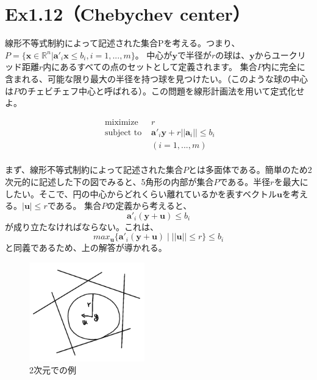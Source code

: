 \documentclass{jsarticle}
\begin{document}
\newpage

\section*{Ex1.12（Chebychev center）}

線形不等式制約によって記述された集合Pを考える。つまり、$P=\{\bm{x}\in \mathbb{R}^n|\bm{a}'_i\bm{x}\leq b_i,i = 1,...,m\}$。 中心が$\bm{y}$で半径が$r$の球は、$\bm{y}$からユークリッド距離$r$内にあるすべての点のセットとして定義されます。 集合$P$内に完全に含まれる、可能な限り最大の半径を持つ球を見つけたい。（このような球の中心は$P$のチェビチェフ中心と呼ばれる）。この問題を線形計画法を用いて定式化せよ。

\begin{equation}
\begin{array}{cc}
\text { miximize } & r \\
\text { subject to } & \bm{a}'_i\bm{y}+r||\bm{a}_i||\leq b_i\\
&(i=1,...,m)
\end{array}
\end{equation}
\\
まず、線形不等式制約によって記述された集合$P$とは多面体である。簡単のため2次元的に記述した下の図でみると、5角形の内部が集合$P$である。半径$r$を最大にしたい。そこで、円の中心からどれくらい離れているかを表すベクトル$\bm{u}$を考える。$|\bm{u}|\leq r$である。
集合$P$の定義から考えると、
\begin{equation}
\bm{a}'_i(\bm{y}+\bm{u})\leq b_i
\end{equation}
が成り立たなければならない。これは、
\begin{equation}
max_{\bm{u}}\{\bm{a}'_i(\bm{y}+\bm{u})\mid ||\bm{u}||\leq r\}\leq b_i
\end{equation}
と同義であるため、上の解答が導かれる。

\begin{figure}[H]
  \centering
  \includegraphics[width=5cm]{center.png}
  \caption{2次元での例}
\end{figure}
\end{document}
